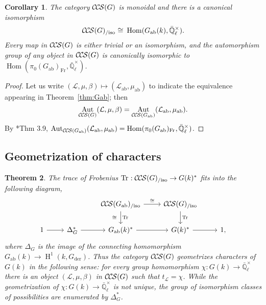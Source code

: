 \documentclass[10pt]{amsart}
\theoremstyle{plain}
\newtheorem{theorem}{Theorem}[section]
\newtheorem{corollary}[theorem]{Corollary}
\theoremstyle{definition}
\newcommand{\EE}{\mathbb{\bar Q}_\ell}
\newcommand{\Fq}{k}
\newcommand{\EEx}{\EE^\times}
\newcommand{\Frob}[1]{\operatorname{Fr}_{#1}}
\DeclareMathOperator{\Aut}{Aut}
\DeclareMathOperator{\Hom}{Hom}
\DeclareMathOperator{\Hh}{H}
\newcommand{\der}{_{\operatorname{der}}}
\newcommand{\ab}{_{\operatorname{ab}}}
\newcommand{\iso}{{\ \cong\ }}
\newcommand{\trFrob}[1]{t_{#1}}
\DeclareMathOperator{\Tr}{Tr}
\newcommand{\TrFrob}[1]{\Tr_{#1}}
\newcommand{\cs}[1]{{\mathcal{#1}}}
\newcommand{\CCS}{{\mathcal{C\hskip-.8pt C\hskip-0.8pt S}}}
\newcommand{\CCSiso}[1]{\CCS(#1)_{/\text{iso}}}
\begin{document}
\begin{corollary}\label{cor:Gab}
The category $\CCS(G)$ is monoidal and there is a canonical isomorphism
\[
\CCSiso{G} \iso \Hom(G\ab(\Fq),\EEx).
\]
Every map in $\CCS(G)$ is either trivial or an isomorphism, and the automorphism group of any object in $\CCS(G)$ is canonically
isomorphic to $\Hom(\pi_0(G\ab)_{\Frob{}},\EEx)$.
\end{corollary}

\begin{proof}
Let us write $(\cs{L},\mu,\beta) \mapsto (\cs{L}\ab,\mu\ab)$ to indicate the equivalence appearing in Theorem~\ref{thm:Gab};
then \[\Aut_{\CCS(G)}(\cs{L},\mu,\beta) = \Aut_{\CCS(G\ab)}(\cs{L}\ab,\mu\ab).\] 
By \cite{cunningham-roe:13a}*{Thm 3.9},  $\Aut_{\CCS(G\ab)}(\cs{L}\ab,\mu\ab) = \Hom(\pi_0(G\ab)_{\Frob{}},\EEx)$.
\end{proof}

\subsection{Geometrization of characters} \label{ssec:geo}

\begin{theorem}\label{thm:geo}
The trace of Frobenius $\TrFrob{} : \CCSiso{G}\to G(\Fq)^*$ fits into the following diagram,
\[
\begin{tikzcd}
\ & & \CCSiso{G\ab} \arrow{d}{\TrFrob{}}[swap]{\iso} \arrow{r}{\iso} & \CCSiso{G} \arrow{d}{\TrFrob{}}& \\
1 \arrow{r} & \Delta_G^* \arrow{r} & G\ab(k)^* \arrow{r} & G(k)^* \arrow{r} & 1,
\end{tikzcd}
\]
where $\Delta_G$ is the image of the connecting homomorphism $G\ab(\Fq) \to \Hh^1(\Fq, G\der)$. 
Thus the category $\CCS(G)$ geometrizes characters of $G(\Fq)$ in the following sense: for every group homomorphism $\chi : G(\Fq) \to \EEx$ there is an object $(\cs{L},\mu,\beta)$ in $\CCS(G)$ such that $\trFrob{\cs{L}} = \chi$. 
While the geometrization of $\chi : G(\Fq) \to \EEx$ is not unique, the group of isomorphism classes of possibilities are enumerated by $\Delta_G^*$.
\end{theorem}
\end{document}
